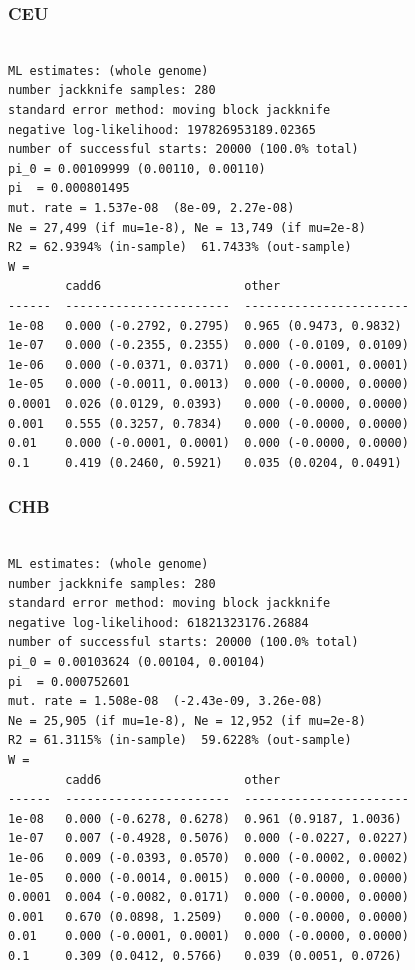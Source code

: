 \documentclass[11pt]{article}
\begin{document}
\subsubsection*{CEU}
\begin{minipage}{\linewidth}\begin{footnotesize}
\begin{verbatim}

ML estimates: (whole genome)
number jackknife samples: 280
standard error method: moving block jackknife
negative log-likelihood: 197826953189.02365
number of successful starts: 20000 (100.0% total)
pi_0 = 0.00109999 (0.00110, 0.00110)
pi  = 0.000801495
mut. rate = 1.537e-08  (8e-09, 2.27e-08)
Ne = 27,499 (if mu=1e-8), Ne = 13,749 (if mu=2e-8)
R2 = 62.9394% (in-sample)  61.7433% (out-sample)
W = 
        cadd6                    other
------  -----------------------  -----------------------
1e-08   0.000 (-0.2792, 0.2795)  0.965 (0.9473, 0.9832)
1e-07   0.000 (-0.2355, 0.2355)  0.000 (-0.0109, 0.0109)
1e-06   0.000 (-0.0371, 0.0371)  0.000 (-0.0001, 0.0001)
1e-05   0.000 (-0.0011, 0.0013)  0.000 (-0.0000, 0.0000)
0.0001  0.026 (0.0129, 0.0393)   0.000 (-0.0000, 0.0000)
0.001   0.555 (0.3257, 0.7834)   0.000 (-0.0000, 0.0000)
0.01    0.000 (-0.0001, 0.0001)  0.000 (-0.0000, 0.0000)
0.1     0.419 (0.2460, 0.5921)   0.035 (0.0204, 0.0491)
\end{verbatim}
\end{footnotesize}\end{minipage}


\subsubsection*{CHB}
\begin{minipage}{\linewidth}\begin{footnotesize}
\begin{verbatim}

ML estimates: (whole genome)
number jackknife samples: 280
standard error method: moving block jackknife
negative log-likelihood: 61821323176.26884
number of successful starts: 20000 (100.0% total)
pi_0 = 0.00103624 (0.00104, 0.00104)
pi  = 0.000752601
mut. rate = 1.508e-08  (-2.43e-09, 3.26e-08)
Ne = 25,905 (if mu=1e-8), Ne = 12,952 (if mu=2e-8)
R2 = 61.3115% (in-sample)  59.6228% (out-sample)
W = 
        cadd6                    other
------  -----------------------  -----------------------
1e-08   0.000 (-0.6278, 0.6278)  0.961 (0.9187, 1.0036)
1e-07   0.007 (-0.4928, 0.5076)  0.000 (-0.0227, 0.0227)
1e-06   0.009 (-0.0393, 0.0570)  0.000 (-0.0002, 0.0002)
1e-05   0.000 (-0.0014, 0.0015)  0.000 (-0.0000, 0.0000)
0.0001  0.004 (-0.0082, 0.0171)  0.000 (-0.0000, 0.0000)
0.001   0.670 (0.0898, 1.2509)   0.000 (-0.0000, 0.0000)
0.01    0.000 (-0.0001, 0.0001)  0.000 (-0.0000, 0.0000)
0.1     0.309 (0.0412, 0.5766)   0.039 (0.0051, 0.0726)
\end{verbatim}
\end{footnotesize}\end{minipage}
\end{document}
